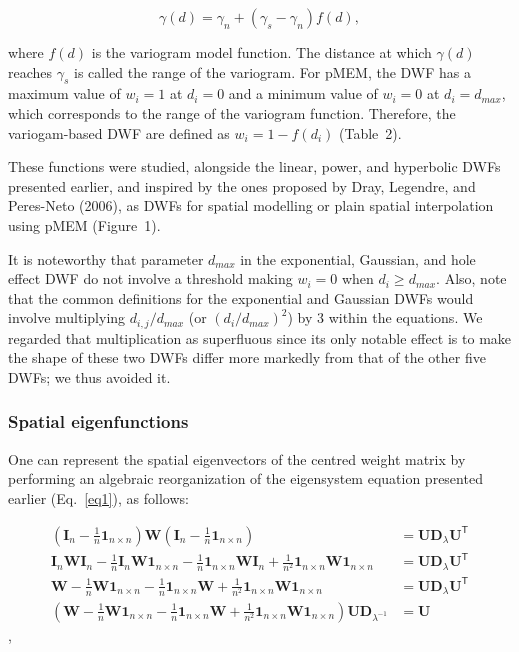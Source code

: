 \documentclass[
]{article}
\begin{document}
\[
\label{eq5}\tag{5}
\gamma(d) = \gamma_n + (\gamma_s - \gamma_n)f(d),
\]

where \(f(d)\) is the variogram model function. The distance at which
\(\gamma(d)\) reaches \(\gamma_s\) is called the range of the variogram.
For pMEM, the DWF has a maximum value of \(w_i = 1\) at \(d_i = 0\) and
a minimum value of \(w_i = 0\) at \(d_i = d_{max}\), which corresponds
to the range of the variogram function. Therefore, the variogam-based
DWF are defined as \(w_i = 1 - f(d_i)\) (Table~2).

These functions were studied, alongside the linear, power, and
hyperbolic DWFs presented earlier, and inspired by the ones proposed by
Dray, Legendre, and Peres-Neto (2006), as DWFs for spatial modelling or
plain spatial interpolation using pMEM (Figure~1).

It is noteworthy that parameter \(d_{max}\) in the exponential,
Gaussian, and hole effect DWF do not involve a threshold making
\(w_i=0\) when \(d_i \geq d_{max}\). Also, note that the common
definitions for the exponential and Gaussian DWFs would involve
multiplying \(d_{i,j}/d_{max}\) (or \((d_i/d_{max})^2\)) by \(3\) within
the equations. We regarded that multiplication as superfluous since its
only notable effect is to make the shape of these two DWFs differ more
markedly from that of the other five DWFs; we thus avoided it.

\subsubsection{Spatial eigenfunctions}\label{spatial-eigenfunctions}

One can represent the spatial eigenvectors of the centred weight matrix
by performing an algebraic reorganization of the eigensystem equation
presented earlier (Eq.~\ref{eq1}), as follows:

\begin{align}
\left(\mathbf{I}_n - \frac{1}{n} \mathbf{1}_{n \times n}\right) \mathbf{W} \left(\mathbf{I}_n - \frac{1}{n} \mathbf{1}_{n \times n}\right) &= \mathbf{U} \mathbf{D}_\lambda \mathbf{U}^\mathsf{T} \label{eq6.1}\tag{6.1} \\
\mathbf{I}_n \mathbf{W} \mathbf{I}_n - \frac{1}{n} \mathbf{I}_n \mathbf{W} \mathbf{1}_{n \times n} - \frac{1}{n} \mathbf{1}_{n \times n} \mathbf{W} \mathbf{I}_n + \frac{1}{n^2} \mathbf{1}_{n \times n} \mathbf{W} \mathbf{1}_{n \times n}  &= \mathbf{U}\mathbf{D}_\lambda \mathbf{U}^\mathsf{T} \label{eq6.2}\tag{6.2} \\
\mathbf{W} - \frac{1}{n} \mathbf{W} \mathbf{1}_{n \times n} - \frac{1}{n} \mathbf{1}_{n \times n} \mathbf{W} + \frac{1}{n^2} \mathbf{1}_{n \times n} \mathbf{W} \mathbf{1}_{n \times n}  &= \mathbf{U}\mathbf{D}_\lambda \mathbf{U}^\mathsf{T} \label{eq6.3}\tag{6.3} \\
\left( \mathbf{W} - \frac{1}{n} \mathbf{W} \mathbf{1}_{n \times n} - \frac{1}{n} \mathbf{1}_{n \times n} \mathbf{W} + \frac{1}{n^2} \mathbf{1}_{n \times n} \mathbf{W} \mathbf{1}_{n \times n}  \right) \mathbf{U} \mathbf{D}_{\lambda^{-1}} &= \mathbf{U}  \label{eq6.4}\tag{6.4}
\end{align},
\end{document}
